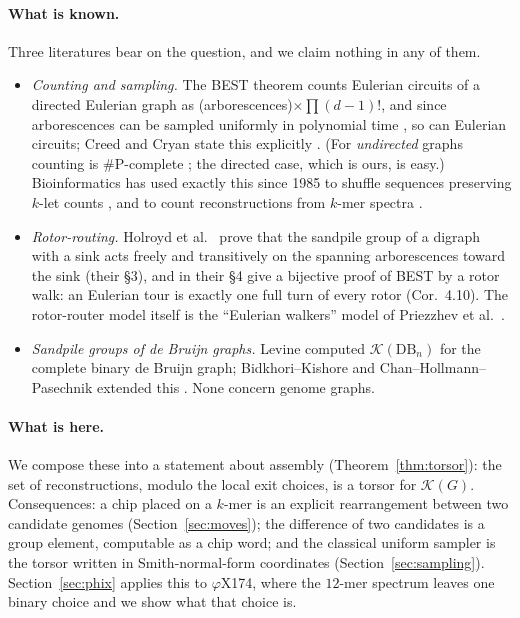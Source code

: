 \documentclass[11pt]{article}
\theoremstyle{plain}
\theoremstyle{definition}
\theoremstyle{remark}
\newcommand{\K}{\mathcal{K}}
\begin{document}
\paragraph{What is known.} Three literatures bear on the question, and we claim nothing in
any of them.
\begin{itemize}
\item \emph{Counting and sampling.} The BEST theorem \cite{AEdB,SmithTutte} counts Eulerian
circuits of a directed Eulerian graph as (arborescences)$\times\prod(d-1)!$, and since
arborescences can be sampled uniformly in polynomial time \cite{CMN,PW,Wilson}, so can
Eulerian circuits; Creed and Cryan state this explicitly \cite{CC}. (For \emph{undirected}
graphs counting is $\#$P-complete \cite{BW}; the directed case, which is ours, is easy.)
Bioinformatics has used exactly this since 1985 to shuffle sequences preserving $k$-let
counts \cite{AE,KMUW,uShuffle}, and to count reconstructions from $k$-mer spectra
\cite{ABCS,KSP}.
\item \emph{Rotor-routing.} Holroyd et al.\ \cite{HLMPPW} prove that the sandpile group of a
digraph with a sink acts freely and transitively on the spanning arborescences toward the
sink (their \S3), and in their \S4 give a bijective proof of BEST by a rotor walk: an
Eulerian tour is exactly one full turn of every rotor (Cor.~4.10). The rotor-router model
itself is the ``Eulerian walkers'' model of Priezzhev et al.\ \cite{PDDK}.
\item \emph{Sandpile groups of de Bruijn graphs.} Levine \cite{Levine} computed
$\K(\mathrm{DB}_n)$ for the complete binary de Bruijn graph; Bidkhori--Kishore and
Chan--Hollmann--Pasechnik extended this \cite{BK,CHP}. None concern genome graphs.
\end{itemize}

\paragraph{What is here.} We compose these into a statement about assembly
(Theorem~\ref{thm:torsor}): the set of reconstructions, modulo the local exit choices, is
a torsor for $\K(G)$. Consequences: a chip placed on a $k$-mer is an explicit
rearrangement between two candidate genomes (Section~\ref{sec:moves}); the difference of
two candidates is a group element, computable as a chip word; and the classical uniform
sampler is the torsor written in Smith-normal-form coordinates
(Section~\ref{sec:sampling}). Section~\ref{sec:phix} applies this to $\varphi$X174, where
the $12$-mer spectrum leaves one binary choice and we show what that choice is.
\end{document}
